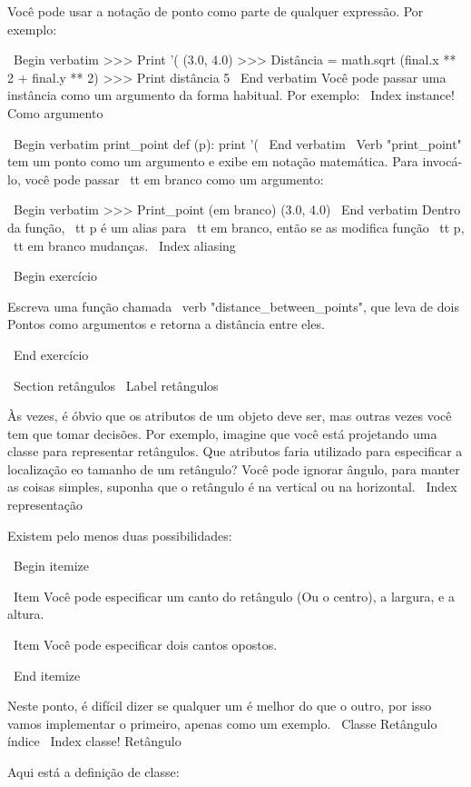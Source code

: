 \documentclass[10pt]{book}
\begin{document}
{{{{{{{{{{{{Você pode usar a notação de ponto como parte de qualquer expressão. Por exemplo:

\ Begin {verbatim}
>>> Print '(%
(3.0, 4.0)
>>> Distância = math.sqrt (final.x ** 2 + final.y ** 2)
>>> Print distância
5
\ End {verbatim}
%
Você pode passar uma instância como um argumento da forma habitual.
Por exemplo:
\ Index {instance! Como argumento}

\ Begin {verbatim}
print_point def (p):
    print '(%
\ End {verbatim}
%
\ Verb "print_point" tem um ponto como um argumento e exibe em
notação matemática. Para invocá-lo, você pode passar {\ tt em branco} como
um argumento:

\ Begin {verbatim}
>>> Print_point (em branco)
(3.0, 4.0)
\ End {verbatim}
%
Dentro da função, {\ tt p} é um alias para {\ tt em branco}, então se
as modifica função {\ tt p}, {\ tt em branco} mudanças.
\ Index {aliasing}


\ Begin {} exercício

Escreva uma função chamada \ verb "distance_between_points", que leva de dois
Pontos como argumentos e retorna a distância entre eles.

\ End {} exercício



\ Section {} retângulos
\ Label {} retângulos

Às vezes, é óbvio que os atributos de um objeto deve ser,
mas outras vezes você tem que tomar decisões. Por exemplo, imagine que você
está projetando uma classe para representar retângulos. Que atributos faria
utilizado para especificar a localização eo tamanho de um retângulo? Você pode
ignorar ângulo, para manter as coisas simples, suponha que o retângulo é
na vertical ou na horizontal.
\ Index {representação}

Existem pelo menos duas possibilidades: 

\ Begin {itemize}

\ Item Você pode especificar um canto do retângulo
(Ou o centro), a largura, e a altura.

\ Item Você pode especificar dois cantos opostos.

\ End {itemize}

Neste ponto, é difícil dizer se qualquer um é melhor do que
o outro, por isso vamos implementar o primeiro, apenas como um exemplo.
\ {Classe Retângulo} índice
\ Index {classe! Retângulo}

Aqui está a definição de classe:

}}}}}}}}}}}}
\end{document}
